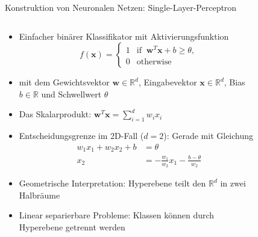 \documentclass[aspectratio=1610, xcolor=dvipsnames, 9pt]{beamer}
\begin{document}
\begin{frame}{Konstruktion von Neuronalen Netzen: Single-Layer-Perceptron}
        \begin{columns}
          \begin{column}{0.7\textwidth}
            \begin{itemize}
              \item Einfacher binärer Klassifikator mit Aktivierungsfunktion
              \begin{equation}
                        f(\mathbf{x}) = \begin{cases}1 & \text{if }\ \mathbf{w}^T \mathbf{x} + b \geq \theta,\\0 & \text{otherwise}\end{cases}
                    \end{equation}
              \item mit dem Gewichtsvektor $\mathbf{w} \in \mathbb{R}^d$, Eingabevektor $\mathbf{x} \in \mathbb{R}^d$, Bias $b \in \mathbb{R}$ und Schwellwert $\theta$ \newline
              \item Das Skalarprodukt: $\mathbf{w}^T\mathbf{x} = \sum_{i=1}^{d} w_i x_i$ \newline
              \item Entscheidungsgrenze im 2D-Fall ($d=2$): Gerade mit Gleichung
              \begin{align}
                w_1 x_1 + w_2 x_2 + b &= \theta \\
                x_2 &= -\frac{w_1}{w_2} x_1 - \frac{b-\theta}{w_2}
              \end{align}
              \item Geometrische Interpretation: Hyperebene teilt den $\mathbb{R}^d$ in zwei Halbräume
              \item Linear separierbare Probleme: Klassen können durch Hyperebene getrennt werden
            \end{itemize}
          \end{column}
          \begin{column}{0.3\textwidth}
       \begin{figure}
       \centering

\end{figure}
\end{column}
\end{columns}
\end{frame}
\end{document}
